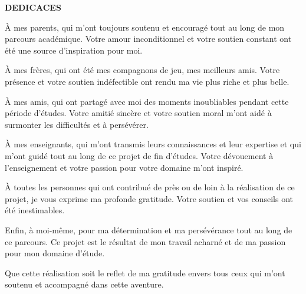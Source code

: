 \documentclass[12pt]{article}
\begin{document}
\begin{center}
\textbf{DEDICACES}
\end{center}

\vspace{1cm}

À mes parents, qui m’ont toujours soutenu et encouragé tout au long de mon parcours académique.  
Votre amour inconditionnel et votre soutien constant ont été une source d’inspiration pour moi.

\vspace{0.8cm}

À mes frères, qui ont été mes compagnons de jeu, mes meilleurs amis. Votre présence et votre soutien indéfectible ont rendu ma vie plus riche et plus belle.

\vspace{0.8cm}

À mes amis, qui ont partagé avec moi des moments inoubliables pendant cette période d’études. Votre amitié sincère et votre soutien moral m’ont aidé à surmonter les difficultés et à persévérer.

\vspace{0.8cm}

À mes enseignants, qui m’ont transmis leurs connaissances et leur expertise et qui m’ont guidé tout au long de ce projet de fin d’études. Votre dévouement à l’enseignement et votre passion pour votre domaine m’ont inspiré.

\vspace{0.8cm}

À toutes les personnes qui ont contribué de près ou de loin à la réalisation de ce projet, je vous exprime ma profonde gratitude. Votre soutien et vos conseils ont été inestimables.

\vspace{0.8cm}

Enfin, à moi-même, pour ma détermination et ma persévérance tout au long de ce parcours. Ce projet est le résultat de mon travail acharné et de ma passion pour mon domaine d’étude.

\vspace{0.8cm}

Que cette réalisation soit le reflet de ma gratitude envers tous ceux qui m’ont soutenu et accompagné dans cette aventure.
\end{document}

